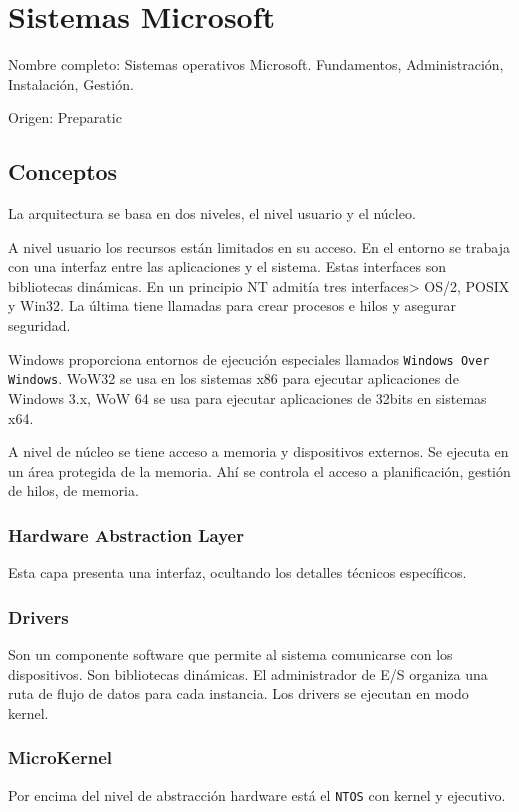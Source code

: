 \setcounter{section}{60} %
\section{Sistemas Microsoft}

Nombre completo: Sistemas operativos Microsoft. Fundamentos, Administración, Instalación, Gestión.

Origen: Preparatic

\localtableofcontents

\subsection{Conceptos}
    La arquitectura se basa en dos niveles, el nivel usuario y el núcleo. 

    A nivel usuario los recursos están limitados en su acceso. En el entorno se trabaja con una interfaz entre las aplicaciones y el sistema. Estas interfaces son bibliotecas dinámicas. En un principio NT admitía tres interfaces> OS/2, POSIX y Win32. La última tiene llamadas para crear procesos e hilos y asegurar seguridad.

    Windows proporciona entornos de ejecución especiales llamados \texttt{Windows Over Windows}. WoW32 se usa en los sistemas x86 para ejecutar aplicaciones de Windows 3.x, WoW 64 se usa para ejecutar aplicaciones de 32bits en sistemas x64.

    A nivel de núcleo se tiene acceso a memoria y dispositivos externos. Se ejecuta en un área protegida de la memoria. Ahí se controla el acceso a planificación, gestión de hilos, de memoria.

    \subsubsection{Hardware Abstraction Layer}
        Esta capa presenta una interfaz, ocultando los detalles técnicos específicos.

    \subsubsection{Drivers}
        Son un componente software que permite al sistema comunicarse con los dispositivos. Son bibliotecas dinámicas. El administrador de E/S organiza una ruta de flujo de datos para cada instancia. Los drivers se ejecutan en modo kernel.

    \subsubsection{MicroKernel}
        Por encima del nivel de abstracción hardware está el \texttt{NTOS} con kernel y ejecutivo.

